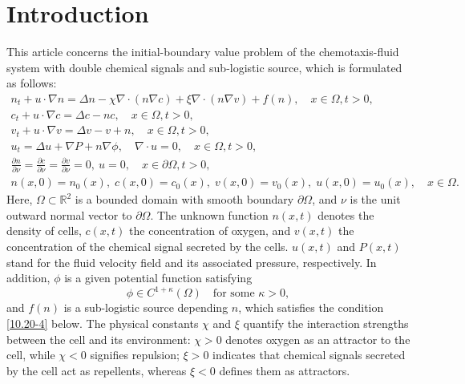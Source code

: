\documentclass[10pt,a4paper]{amsart}
\numberwithin{equation}{section}
\begin{document}
\section{Introduction}

This article concerns the initial-boundary value problem of the chemotaxis-fluid system with double chemical signals and sub-logistic source, which is formulated as follows:
\begin{equation}\label{eq1.1}
\begin{gathered}
n_t + u \cdot \nabla n = \Delta n - \chi \nabla \cdot (n\nabla c)
+\xi \nabla \cdot (n\nabla v) + f(n), \quad x \in \Omega, t > 0, \\
c_t + u \cdot \nabla c = \Delta c - nc, \quad x \in \Omega, t > 0, \\
v_t + u \cdot \nabla v= \Delta v - v + n, \quad
 x \in \Omega, t > 0, \\
u_t  = \Delta u + \nabla P + n\nabla \phi, \quad \nabla \cdot u = 0, \quad
 x \in \Omega, t > 0, \\
\frac{\partial n}{\partial \nu}=\frac{\partial c}{\partial \nu}
= \frac{\partial v}{\partial \nu}= 0, \ u= 0, \quad x \in \partial\Omega, t >
0, \\
n(x, 0) = n_0(x), \; c(x, 0) = c_0(x), \; v(x, 0) = v_0(x), \; u(x, 0) = u_0(x), 
\quad  x \in \Omega.
\end{gathered}
\end{equation}
Here, $\Omega\subset \mathbb{R}^2$ is a bounded domain with smooth boundary 
$\partial\Omega$, and $\nu$ is the unit outward normal vector to $\partial\Omega$. 
The unknown function $n(x,t)$ denotes the density of cells, $c(x,t)$ the concentration 
of oxygen, and $v(x,t)$ the
concentration of the chemical signal secreted by the cells. 
$u(x,t)$ and $P(x,t)$ stand for  the fluid velocity field and its associated pressure,
respectively. In addition, $\phi$ is a given potential function satisfying
\begin{equation}\label{eq1.2}
\phi \in  C^{1 +\kappa}(\Omega) \quad\text{for some } \kappa> 0,
\end{equation}
and $f(n)$ is a sub-logistic source depending $n$, which satisfies the condition 
\eqref{10.20-4} below. The physical constants
$\chi$ and $\xi$ quantify the interaction strengths between the cell and its 
environment:
$\chi>0$ denotes oxygen as an attractor to the cell, while
$\chi<0$ signifies repulsion;
$\xi>0$ indicates that chemical signals secreted by the cell act as repellents, whereas
$\xi<0$ defines them as attractors.
\end{document}
